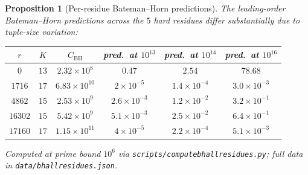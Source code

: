 \documentclass[11pt]{article}
\renewcommand{\_}{\origunderscore\allowbreak}
\newtheorem{proposition}[theorem]{Proposition}
\theoremstyle{definition}
\theoremstyle{remark}
\begin{document}
\begin{proposition}[Per-residue Bateman--Horn predictions]\label{prop:perBH}
The leading-order Bateman--Horn predictions across the $5$ hard
residues differ substantially due to tuple-size variation:

\begin{center}
\begin{tabular}{cccccc}
\hline
$r$ & $K$ & $C_{\mathrm{BH}}$ &
  pred.\ at $10^{13}$ & pred.\ at $10^{14}$ & pred.\ at $10^{16}$ \\
\hline
$0$      & $13$ & $2.32\times 10^{8}$  & $0.47$              & $2.54$               & $78.68$ \\
$1716$   & $17$ & $6.83\times 10^{10}$ & $2\times 10^{-5}$   & $1.4\times 10^{-4}$  & $3.0\times 10^{-3}$ \\
$4862$   & $15$ & $2.53\times 10^{9}$  & $2.6\times 10^{-3}$ & $1.2\times 10^{-2}$  & $3.2\times 10^{-1}$ \\
$16302$  & $15$ & $5.42\times 10^{9}$  & $5.1\times 10^{-3}$ & $2.5\times 10^{-2}$  & $6.4\times 10^{-1}$ \\
$17160$  & $17$ & $1.15\times 10^{11}$ & $4\times 10^{-5}$   & $2.2\times 10^{-4}$  & $5.1\times 10^{-3}$ \\
\hline
\end{tabular}
\end{center}

Computed at prime bound $10^{6}$ via
\texttt{scripts/compute\_bh\_all\_residues.py}; full data in
\texttt{data/bh\_all\_residues.json}.
\end{proposition}
\end{document}
